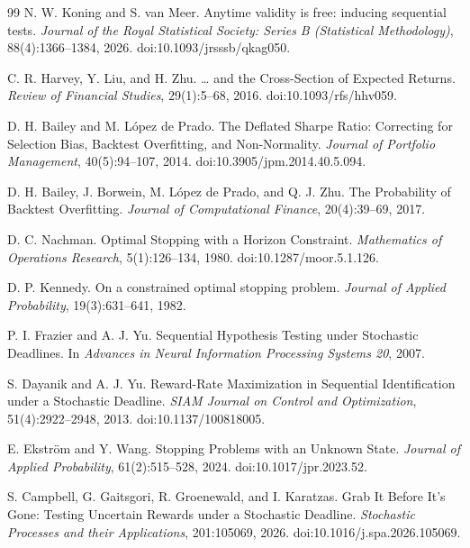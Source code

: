 \documentclass[11pt]{article}
\numberwithin{equation}{section}
\theoremstyle{plain}
\theoremstyle{definition}
\theoremstyle{remark}
\begin{document}
\begin{thebibliography}{99}
N. W. Koning and S. van Meer.
\newblock Anytime validity is free: inducing sequential tests.
\newblock \emph{Journal of the Royal Statistical Society: Series B (Statistical Methodology)}, 88(4):1366--1384, 2026.
\newblock doi:10.1093/jrsssb/qkag050.

C. R. Harvey, Y. Liu, and H. Zhu.
\newblock \ldots{} and the Cross-Section of Expected Returns.
\newblock \emph{Review of Financial Studies}, 29(1):5--68, 2016.
\newblock doi:10.1093/rfs/hhv059.

D. H. Bailey and M. L\'opez de Prado.
\newblock The Deflated Sharpe Ratio: Correcting for Selection Bias, Backtest Overfitting, and Non-Normality.
\newblock \emph{Journal of Portfolio Management}, 40(5):94--107, 2014.
\newblock doi:10.3905/jpm.2014.40.5.094.

D. H. Bailey, J. Borwein, M. L\'opez de Prado, and Q. J. Zhu.
\newblock The Probability of Backtest Overfitting.
\newblock \emph{Journal of Computational Finance}, 20(4):39--69, 2017.

D. C. Nachman.
\newblock Optimal Stopping with a Horizon Constraint.
\newblock \emph{Mathematics of Operations Research}, 5(1):126--134, 1980.
\newblock doi:10.1287/moor.5.1.126.

D. P. Kennedy.
\newblock On a constrained optimal stopping problem.
\newblock \emph{Journal of Applied Probability}, 19(3):631--641, 1982.

P. I. Frazier and A. J. Yu.
\newblock Sequential Hypothesis Testing under Stochastic Deadlines.
\newblock In \emph{Advances in Neural Information Processing Systems 20}, 2007.

S. Dayanik and A. J. Yu.
\newblock Reward-Rate Maximization in Sequential Identification under a Stochastic Deadline.
\newblock \emph{SIAM Journal on Control and Optimization}, 51(4):2922--2948, 2013.
\newblock doi:10.1137/100818005.

E. Ekstr\"om and Y. Wang.
\newblock Stopping Problems with an Unknown State.
\newblock \emph{Journal of Applied Probability}, 61(2):515--528, 2024.
\newblock doi:10.1017/jpr.2023.52.

S. Campbell, G. Gaitsgori, R. Groenewald, and I. Karatzas.
\newblock Grab It Before It's Gone: Testing Uncertain Rewards under a Stochastic Deadline.
\newblock \emph{Stochastic Processes and their Applications}, 201:105069, 2026.
\newblock doi:10.1016/j.spa.2026.105069.


\end{thebibliography}
\end{document}
